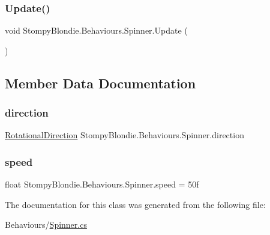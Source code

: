 \subsubsection{\texorpdfstring{Update()}{Update()}}
{\footnotesize\ttfamily void Stompy\+Blondie.\+Behaviours.\+Spinner.\+Update (\begin{DoxyParamCaption}{ }\end{DoxyParamCaption})\hspace{0.3cm}{\ttfamily [inline]}}



\subsection{Member Data Documentation}
\mbox{\label{class_stompy_blondie_1_1_behaviours_1_1_spinner_a8443ae6a767b91a6d398416f08fe69be}} 
\subsubsection{\texorpdfstring{direction}{direction}}
{\footnotesize\ttfamily \mbox{\hyperlink{namespace_stompy_blondie_1_1_common_1_1_types_aa8d41922aaa5f468ef8e2c8f8e083084}{Rotational\+Direction}} Stompy\+Blondie.\+Behaviours.\+Spinner.\+direction}

\mbox{\label{class_stompy_blondie_1_1_behaviours_1_1_spinner_a34128a5d487db9bf69d6e9aa84ec2130}} 
\subsubsection{\texorpdfstring{speed}{speed}}
{\footnotesize\ttfamily float Stompy\+Blondie.\+Behaviours.\+Spinner.\+speed = 50f}



The documentation for this class was generated from the following file\+:\begin{DoxyCompactItemize}
\item 
Behaviours/\mbox{\hyperlink{_spinner_8cs}{Spinner.\+cs}}\end{DoxyCompactItemize}
